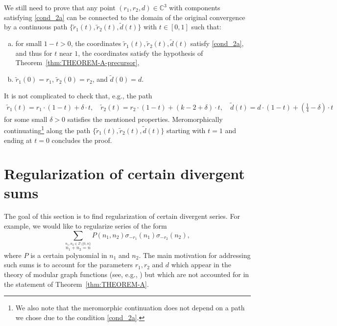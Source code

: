 \documentclass[]{article}
\begin{document}
We still need to prove that any point $(r_1, r_2, d) \in \mathbb{C}^3$ with components satisfying  \eqref{cond_2a} can be connected to the domain of the original convergence by a continuous path $ \{\widetilde  r_1(t),   \widetilde r_2(t), \widetilde  d(t) \}$ with $t \in [0,1]$ such that:
\begin{enumerate}[a)]
    \item for small $1-t>0$, the coordinates $ \widetilde  r_1(t),  \widetilde  r_2 (t),  \widetilde  d(t)$ satisfy \eqref{cond_2a}, and thus for $t$ near $1$, the coordinates satisfy the hypothesis of Theorem~\ref{thm:THEOREM-A-precursor},
    \item $ \widetilde  r_1(0)=r_1$, $ \widetilde r_2(0)=r_2$, and $ \widetilde d(0)=d$.
\end{enumerate}
It is not complicated to check that, e.g., the path 
\begin{equation}
\begin{split}
  \widetilde   r_1(t) =  r_1 \cdot  (1-t) + \delta\cdot t, \quad 
   \widetilde  r_2(t) = r_2 \cdot (1-t) + (k - 2 + \delta) \cdot t , \quad  
    \widetilde  d(t) = d \cdot (1-t) +  ( \tfrac{1}{4} - \delta) \cdot t
\end{split}    
\end{equation}
for some small $\delta>0$ satisfies the mentioned properties. Meromorphically continuating\footnote{We also note that the meromorphic continuation does not depend on a path we chose due to the condition \eqref{cond_2a}.} along the path $\{\widetilde  r_1(t),   \widetilde r_2(t), \widetilde  d(t) \}$ starting with $t=1$ and ending at $t=0$ concludes the proof. 
\section{Regularization of certain divergent sums}\label{sec:regularization_of_divergent_sums}
The goal of this section is to find regularization of certain divergent series.  For example, we would like to regularize series of the form
\begin{equation}
        \sum_{ \stackrel{n_1, n_2 \in \mathbb{Z} \setminus \{0, n\}  }{n_1+n_2=n}}  P(n_1, n_2) \sigma_{-r_1}(n_1) \sigma_{-r_2}(n_2),
\end{equation}
where $P$ is a certain polynomial in $n_1$ and $n_2$.  The main motivation for addressing such sums is to account for the parameters $r_1, r_2$ and $d$ which appear in the theory of modular graph functions (see, e.g., \cite{DGW, DKS2021_2}) but which are not accounted for in the statement of Theorem~\ref{thm:THEOREM-A}. 
\end{document}
